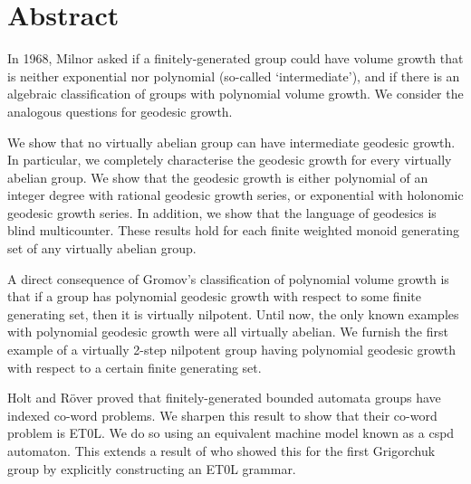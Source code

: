 \chapter{Abstract}

{
\setlength{\parskip}{1ex plus 0.5ex minus 0.2ex}
\setlength{\parindent}{0pt}

In 1968, Milnor asked if a finitely-generated group could have volume growth that is neither exponential nor polynomial (so-called `intermediate'), and if there is an algebraic classification of groups with polynomial volume growth.
We consider the analogous questions for geodesic growth.

We show that no virtually abelian group can have intermediate geodesic growth.
In particular, we completely characterise the geodesic growth for every virtually abelian group.
We show that the geodesic growth is either polynomial of an integer degree with rational geodesic growth series, or exponential with holonomic geodesic growth series.
In addition, we show that the language of geodesics is blind multicounter.
These results hold for each finite weighted monoid generating set of any virtually abelian group.

A direct consequence of Gromov's classification of polynomial volume growth is that if a group has polynomial geodesic growth with respect to some finite generating set, then it is virtually nilpotent. 
Until now, the only known examples with polynomial geodesic growth were all virtually abelian. 
We furnish the first example of a virtually 2-step nilpotent group having polynomial geodesic growth with respect to a certain finite generating set.

Holt and R\"over proved that finitely-generated bounded automata groups have indexed co-word problems.
We sharpen this result to show that their co-word problem is ET0L.
We do so using an equivalent machine model known as a cspd automaton.
This extends a result of \citeauthor{ciobanu2018} who showed this for the first Grigorchuk group by explicitly constructing an ET0L grammar.

}
